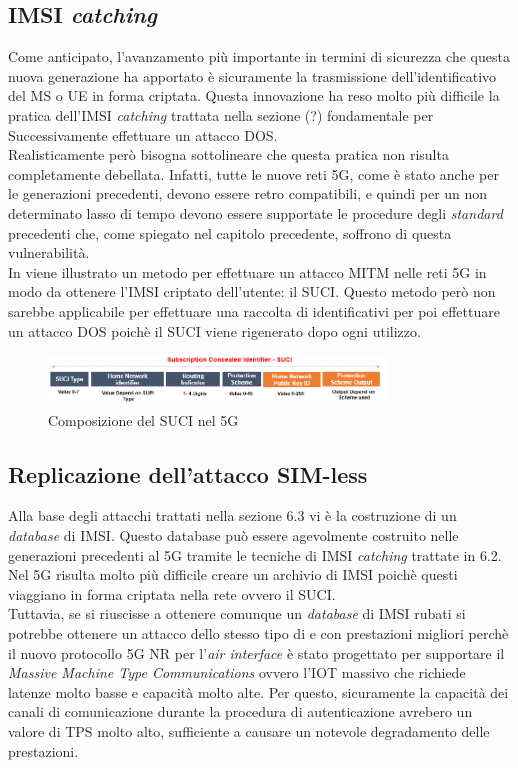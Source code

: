 \subsection{IMSI \textit{catching}}
Come anticipato, l'avanzamento più importante in termini di sicurezza che questa nuova generazione ha apportato è sicuramente la trasmissione dell'identificativo del MS o UE in forma 
criptata. Questa innovazione ha reso molto più difficile la pratica dell'IMSI \textit{catching} trattata nella sezione (?) fondamentale per Successivamente effettuare un attacco DOS.\\
Realisticamente però bisogna sottolineare che questa pratica non risulta completamente debellata. Infatti, tutte le nuove reti 5G, come è stato anche per le generazioni precedenti, devono 
essere retro compatibili, e quindi per un non determinato lasso di tempo devono essere supportate le procedure degli \textit{standard} precedenti che, come spiegato nel capitolo precedente, soffrono 
di questa vulnerabilità.\\
In \cite{suci-catch} viene illustrato un metodo per effettuare un attacco MITM nelle reti 5G in modo da ottenere l'IMSI criptato dell'utente: il SUCI. Questo metodo però non sarebbe applicabile per effettuare 
una raccolta di identificativi per poi effettuare un attacco DOS poichè il SUCI viene rigenerato dopo ogni utilizzo.
\begin{figure}[ht]
    \centering
    \includegraphics[width=0.8\textwidth]{images/5g-suci.png}
    \caption{Composizione del SUCI nel 5G}
\end{figure}

\subsection{Replicazione dell'attacco SIM-less}
Alla base degli attacchi trattati nella sezione 6.3 vi è la costruzione di un \textit{database} di IMSI. Questo database può essere agevolmente costruito nelle generazioni precedenti al 5G 
tramite le tecniche di IMSI \textit{catching} trattate in 6.2. Nel 5G risulta molto più difficile creare un archivio di IMSI poichè questi viaggiano in forma criptata nella rete ovvero il SUCI.\\
Tuttavia, se si riuscisse a ottenere comunque un \textit{database} di IMSI rubati si potrebbe ottenere un attacco dello stesso tipo di \cite{gsm-dos-simless} e \cite{umts-dos} con prestazioni migliori 
perchè il nuovo protocollo 5G NR\cite{5g-nr} per l'\textit{air interface} è stato progettato per supportare il \textit{Massive Machine Type Communications} ovvero l'IOT massivo che richiede latenze molto basse e capacità molto alte.
Per questo, sicuramente la capacità dei canali di comunicazione durante la procedura di autenticazione avrebero un valore di TPS molto alto, sufficiente a causare un notevole degradamento delle prestazioni.


